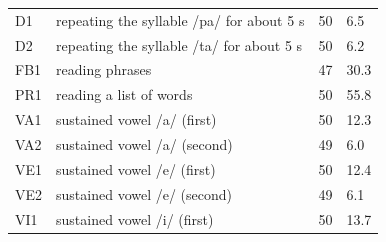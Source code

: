 \documentclass[11pt,a4paper]{article}
\begin{document}
\begin{center}
\begin{longtable}{>{\raggedright\arraybackslash}p{2.07cm}>{\raggedright\arraybackslash}p{8.60cm}>{\raggedleft\arraybackslash}p{2.07cm}>{\raggedleft\arraybackslash}p{2.07cm}}
\hspace{0pt}D1 & \hspace{0pt}repeating the syllable /\allowbreak{}pa/\allowbreak{} for about 5 s & \hspace{0pt}50 & \hspace{0pt}6.5\\
\hspace{0pt}D2 & \hspace{0pt}repeating the syllable /\allowbreak{}ta/\allowbreak{} for about 5 s & \hspace{0pt}50 & \hspace{0pt}6.2\\
\hspace{0pt}FB1 & \hspace{0pt}reading phrases & \hspace{0pt}47 & \hspace{0pt}30.3\\
\hspace{0pt}PR1 & \hspace{0pt}reading a list of words & \hspace{0pt}50 & \hspace{0pt}55.8\\
\hspace{0pt}VA1 & \hspace{0pt}sustained vowel /\allowbreak{}a/\allowbreak{} (first) & \hspace{0pt}50 & \hspace{0pt}12.3\\
\hspace{0pt}VA2 & \hspace{0pt}sustained vowel /\allowbreak{}a/\allowbreak{} (second) & \hspace{0pt}49 & \hspace{0pt}6.0\\
\hspace{0pt}VE1 & \hspace{0pt}sustained vowel /\allowbreak{}e/\allowbreak{} (first) & \hspace{0pt}50 & \hspace{0pt}12.4\\
\hspace{0pt}VE2 & \hspace{0pt}sustained vowel /\allowbreak{}e/\allowbreak{} (second) & \hspace{0pt}49 & \hspace{0pt}6.1\\
\hspace{0pt}VI1 & \hspace{0pt}sustained vowel /\allowbreak{}i/\allowbreak{} (first) & \hspace{0pt}50 & \hspace{0pt}13.7\\

\end{longtable}
\end{center}
\end{document}
